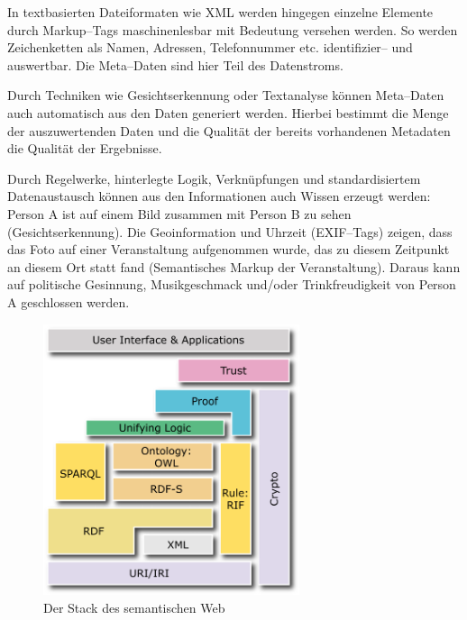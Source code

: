 In textbasierten Dateiformaten wie XML werden hingegen einzelne Elemente durch Markup--Tags maschinenlesbar mit Bedeutung versehen werden. So werden Zeichenketten als Namen, Adressen, Telefonnummer etc. identifizier-- und auswertbar. Die Meta--Daten sind hier Teil des Datenstroms.

Durch Techniken wie Gesichtserkennung oder Textanalyse können Meta--Daten auch automatisch aus den Daten generiert werden. Hierbei bestimmt die Menge der auszuwertenden Daten und die Qualität der bereits vorhandenen Metadaten die Qualität der Ergebnisse.

Durch Regelwerke, hinterlegte Logik, Verknüpfungen und standardisiertem Datenaustausch können aus den Informationen auch Wissen erzeugt werden:
Person A ist auf einem Bild zusammen mit Person B zu sehen (Gesichtserkennung). Die Geoinformation und Uhrzeit (EXIF--Tags) zeigen, dass das Foto auf einer Veranstaltung aufgenommen wurde, das zu diesem Zeitpunkt an diesem Ort statt fand (Semantisches Markup der Veranstaltung).
Daraus kann auf politische Gesinnung, Musikgeschmack und/oder Trinkfreudigkeit von Person A geschlossen werden.

\begin{figure}[H]
\begin{center}
\includegraphics[width=0.67\textwidth]{layerCake-4.png}
\caption[Der Stack des semantischen Web]{Der Stack des semantischen Web\protect\footnotemark}
\label{pic:tsemanticstack}
\end{center}
\end{figure}
